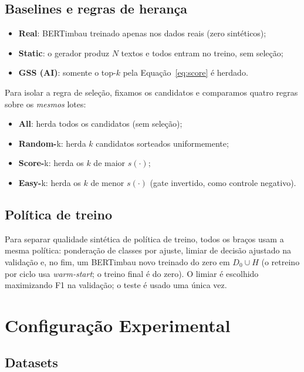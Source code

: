 \documentclass[conference]{IEEEtran}
\begin{document}
\subsection{Baselines e regras de heran\c{c}a}

\begin{itemize}
\item \textbf{Real}: BERTimbau treinado apenas nos dados reais (zero sint\'eticos);
\item \textbf{Static}: o gerador produz $N$ textos e todos entram no treino, sem sele\c{c}\~ao;
\item \textbf{GSS (AI)}: somente o top-$k$ pela Equa\c{c}\~ao~\ref{eq:score} \'e herdado.
\end{itemize}

Para isolar a regra de sele\c{c}\~ao, fixamos os candidatos e comparamos quatro regras sobre os \emph{mesmos} lotes:

\begin{itemize}
\item \textbf{All}: herda todos os candidatos (sem sele\c{c}\~ao);
\item \textbf{Random-}k: herda $k$ candidatos sorteados uniformemente;
\item \textbf{Score-}k: herda os $k$ de maior $s(\cdot)$;
\item \textbf{Easy-}k: herda os $k$ de menor $s(\cdot)$ (gate invertido, como controle negativo).
\end{itemize}

\subsection{Pol\'itica de treino}

Para separar qualidade sint\'etica de pol\'itica de treino, todos os bra\c{c}os usam a mesma pol\'itica: pondera\c{c}\~ao de classes por ajuste, limiar de decis\~ao ajustado na valida\c{c}\~ao e, no fim, um BERTimbau novo treinado do zero em $D_0 \cup H$ (o retreino por ciclo usa \emph{warm-start}; o treino final \'e do zero). O limiar \'e escolhido maximizando F1 na valida\c{c}\~ao; o teste \'e usado uma \'unica vez.

\section{Configura\c{c}\~ao Experimental}

\subsection{Datasets}
\end{document}

